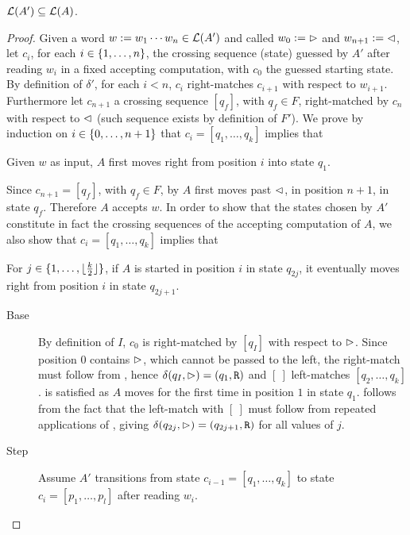 \begin{lemm}\label{lem:2DFAto1NFA-2}
	$\mathcal L(A')\subseteq\mathcal L(A)$.
\end{lemm}
\begin{proof}
	Given a word $w:=w_1\cdots w_n\in\mathcal L(A')$ and called $w_0:=\rhd$ and $w_{n+1}:=\lhd$, let $c_i$, for each $i\in\{1,\dots,n\}$, the crossing sequence (state) guessed by $A'$ after reading $w_i$ in a fixed accepting computation, with $c_0$ the guessed starting state.
	By definition of $\delta'$, for each $i<n$, $c_i$ right-matches $c_{i+1}$ with respect to $w_{i+1}$.
	Furthermore let $c_{n+1}$ a crossing sequence $[q_f]$, with $q_f\in F$, right-matched by $c_n$ with respect to $\lhd$ (such sequence exists by definition of $F'$).
	We prove by induction on $i\in\{0,\dots,n+1\}$ that $c_i=[q_1,\dots,q_k]$ implies that
	\begin{statements}
		\item \label{lem:2DFAto1NFA-2-1} Given $w$ as input, $A$ first moves right from position $i$ into state $q_1$.
	\end{statements}
	Since $c_{n+1}=[q_f]$, with $q_f\in F$, by  $A$ first moves past $\lhd$, in position $n+1$, in state $q_f$. Therefore $A$ accepts $w$.
	In order to show that the states chosen by $A'$ constitute in fact the crossing sequences of the accepting computation of $A$, we also show that $c_i=[q_1,\dots,q_k]$ implies that
	\begin{statements}[resume]
		\item \label{lem:2DFAto1NFA-2-2} For $j\in\{1,\dots,\lfloor \frac{k}{2} \rfloor\}$, if $A$ is started in position $i$ in state $q_{2j}$, it eventually moves right from position $i$ in state $q_{2j+1}$.
	\end{statements}
	\begin{description}
		\item[Base] By definition of $I$, $c_0$ is right-matched by $[q_I]$ with respect to $\rhd$. Since position $0$ contains $\rhd$, which cannot be passed to the left, the right-match must follow from , hence $\delta(q_I,\rhd)=(q_1,\mathtt R)$ and $[~]$ left-matches $[q_2,\dots,q_k]$.
		       is satisfied as $A$ moves for the first time in position $1$ in state $q_1$.
		       follows from the fact that the left-match with $[~]$ must follow from repeated applications of , giving $\delta(q_{2j},\rhd)=(q_{2j+1},\mathtt R)$ for all values of $j$.
		\item[Step] Assume $A'$ transitions from state $c_{i-1}=[q_1,\dots,q_k]$ to state $c_i=[p_1,\dots,p_l]$ after reading $w_i$.

\end{description}
\end{proof}
